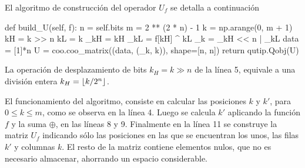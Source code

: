 %
%
\noindent
El algoritmo de construcción del operador $U_f$ se detalla a continuación
%
\begin{pycode}
def build_U(self, f):
	n = self.bits
	m = 2 ** (2 * n) - 1
	k = np.arange(0, m + 1)
	kH = k >> n
	kL = k %
	_kH = kH
	_kL = f[kH] ^ kL
	_k = _kH << n | _kL
	data = [1]*n
	U = coo.coo_matrix((data, (_k, k)), shape=[n, n])
	return qutip.Qobj(U)
\end{pycode}
%
La operación de desplazamiento de bits $k_H = k \gg n$ de la línea 5, equivale a 
una división entera $k_H = \lfloor k/2^n \rfloor$.

El funcionamiento del algoritmo, consiste en calcular las posiciones $k$ y $k'$, 
para $0 \leq k \leq m$, como se observa en la línea 4. Luego se calcula $k'$ 
aplicando la función $f$ y la suma $\oplus$, en las líneas 8 y 9. Finalmente en 
la línea 11 se construye la matriz $U_f$ indicando sólo las posiciones en las 
que se encuentran los unos, las filas $k'$ y columnas $k$. El resto de la matriz 
contiene elementos nulos, que no es necesario almacenar, ahorrando un espacio 
considerable.
